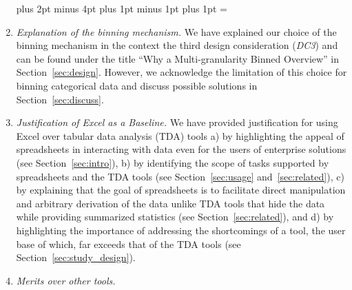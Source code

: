 \begin{enumerate}
\leftmargin=25pt \rightmargin=0pt   \itemindent=0pt \listparindent=0pt \topsep=0pt plus 2pt minus 4pt \partopsep=0pt plus 1pt minus 1pt \parsep=0pt plus 1pt \itemsep=\parsep

\item \textit{Explanation of the binning mechanism.} We have explained our choice of the binning mechanism in the context the third design consideration (\emph{DC3}) and can be found under the title ``Why a Multi-granularity Binned Overview'' in Section~\ref{sec:design}.  However, we acknowledge the limitation of this choice for binning categorical data and discuss possible solutions in Section~\ref{sec:discuss}. 

\item \textit{Justification of Excel as a Baseline.}
We have provided justification for using Excel over tabular data analysis (TDA) tools a) by highlighting the appeal of spreadsheets in interacting with data even for the users of enterprise solutions (see Section~\ref{sec:intro}), b) by identifying the scope of tasks supported by spreadsheets and the TDA tools (see Section~\ref{sec:usage} and~\ref{sec:related}), c) by explaining that the goal of spreadsheets is to facilitate direct manipulation and arbitrary derivation of the data unlike TDA tools that hide the data while providing summarized statistics (see Section~\ref{sec:related}), and d) by highlighting the importance of addressing the shortcomings of a tool, the user base of which, far exceeds that of the TDA tools (see Section~\ref{sec:study_design}). 

\item \textit{Merits over other tools.}  


\end{enumerate}
